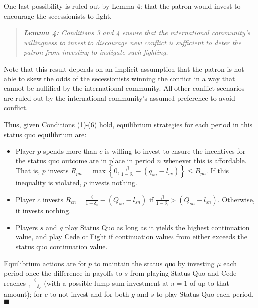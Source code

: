 \documentclass[12pt]{article}
\newcommand{\de}{\delta}
\begin{document}
One last possibility is ruled out by Lemma 4: that the patron would invest to encourage the secessionists to fight. 

\begin{quotation}
\noindent \textit{{\bf Lemma 4:} Conditions 3 and 4 ensure that the international community's willingness to invest to discourage new conflict is sufficient to deter the patron from investing to instigate such fighting.}
\end{quotation}

Note that this result depends on an implicit assumption that the patron is not able to skew the odds of the secessionists winning the conflict in a way that cannot be nullified by the international community. All other conflict scenarios are ruled out by the international community's assumed preference to avoid conflict.

Thus, given Conditions (1)-(6) hold, equilibrium strategies for each period in this status quo equilibrium are:
\begin{itemize}
	\item Player $p$ spends more than $c$ is willing to invest to ensure the incentives for the status quo outcome are in place in period $n$ whenever this is affordable. That is, $p$ invests $R_{pn} = \max\left\{0,\frac{\beta}{1-\delta_c} -(q_{sn} - l_{sn})\right\}\leq B_{pn}$. If this inequality is violated, $p$ invests nothing.
	\item Player $c$ invests $R_{cn} = \frac{\beta}{1-\delta_c} -(Q_{sn} - l_{sn})$ if $\frac{\beta}{1-\delta_c} > (Q_{sn} - l_{sn})$. Otherwise, it invests nothing. 
	\item Players $s$ and $g$ play Status Quo as long as it yields the highest continuation value, and play Cede or Fight if continuation values from either exceeds the status quo continuation value. 
\end{itemize}

Equilibrium actions are for $p$ to maintain the status quo by investing $\mu$ each period once the difference in payoffs to $s$ from playing Status Quo and Cede reaches $\frac{\beta}{1-\de_c}$ (with a possible lump sum investment at $n=1$ of up to that amount); for $c$ to not invest and for both $g$ and $s$ to play Status Quo each period. \hfill $\blacksquare$
\end{document}
